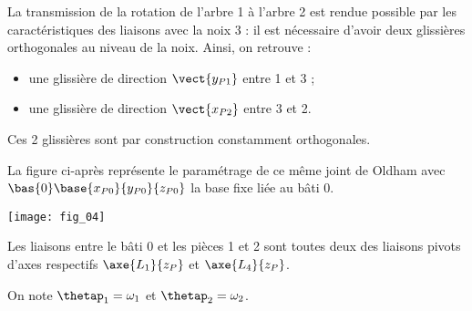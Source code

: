 La transmission de la rotation de l’arbre 1 à l’arbre 2 est rendue possible par les caractéristiques des liaisons avec la noix 3 : il est nécessaire d’avoir deux glissières orthogonales au niveau de la noix. Ainsi, on retrouve :
\begin{itemize}
\item une glissière de direction $\vect{y_{P1}}$ entre 1 et 3 ;
\item une glissière de direction $\vect{x_{P2}}$ entre 3 et 2.
\end{itemize}

Ces 2 glissières sont par construction constamment orthogonales.

La figure ci-après représente le paramétrage de ce même joint de Oldham avec $\bas{0}\base{x_{P0}}{y_{P0}}{z_{P0}}$ la base fixe liée au bâti 0.





\begin{center}%
\texttt{[image: fig\_04]}
\end{center}




Les liaisons entre le bâti 0 et les pièces 1 et 2 sont toutes deux des liaisons pivots d’axes respectifs
$\axe{L_1}{z_P}$ et $\axe{L_4}{z_P}$.




On note $\thetap_1 = \omega_1$ et $\thetap_2 = \omega_2$.


